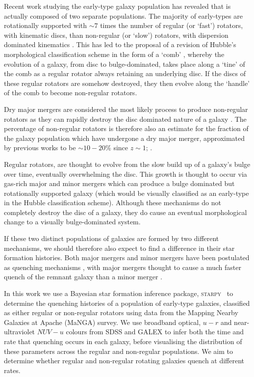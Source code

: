 \documentclass[useAMS,usenatbib]{mn2e}
\begin{document}
Recent work studying the early-type galaxy population has revealed that is actually composed of two separate populations. The majority of early-types are rotationally supported \citep{emsellem11} with $\sim7$ times the number of regular (or `fast') rotators, with kinematic discs, than non-regular (or `slow') rotators, with dispersion dominated kinematics \citep{cappellari07, emsellem07}.  This has led to the proposal of a revision of Hubble's morphological classification scheme in the form of a `comb' \citep{cappellari16}, whereby the evolution of a galaxy, from  disc to bulge-dominated, takes place along a `tine' of the comb as a regular rotator always retaining an underlying disc. If the discs of these regular rotators are somehow destroyed, they then evolve along the `handle' of the comb to become non-regular rotators. 

Dry major mergers are considered the most likely process to produce non-regular rotators \citep{duc11, naab14} as they can rapidly destroy the disc dominated nature of a galaxy \citep{toomre72}. The percentage of non-regular rotators is therefore also an estimate for the fraction of the galaxy population which have undergone a dry major merger, approximated by previous works to be $\sim10-20\%$ since $z\sim1$; \citep[][]{khochfar09}.

Regular rotators, are thought to evolve from the slow build up of a galaxy's bulge over time, eventually overwhelming the disc. This growth is thought to occur via gas-rich major and minor mergers \citep{duc11} which can produce a bulge dominated but rotationally supported galaxy (which would be visually classified as an early-type in the Hubble classification scheme). Although these mechanisms do not completely destroy the disc of a galaxy, they do cause an eventual morphological change to a visually bulge-dominated system.

If these two distinct populations of galaxies are formed by two different mechanisms, we should therefore also expect to find a difference in their star formation histories. Both major mergers and minor mergers have been postulated as quenching mechanisms \citep{?}, with major mergers thought to cause a much faster quench of the remnant galaxy than a minor merger \citep{?}. 

In this work we use a Bayesian star formation inference package, \textsc{starpy}~ to determine the quenching histories of a population of early-type galaxies, classified as either regular or non-regular rotators using data from the Mapping Nearby Galaxies at Apache (MaNGA) survey. We use broadband optical, $u-r$ and near-ultraviolet $NUV-u$ colours from SDSS and GALEX to infer both the time and rate that quenching occurs in each galaxy, before visualising the distribution of these parameters across the regular and non-regular populations. We aim to determine whether regular and non-regular rotating galaxies quench at different rates. 
\end{document}
